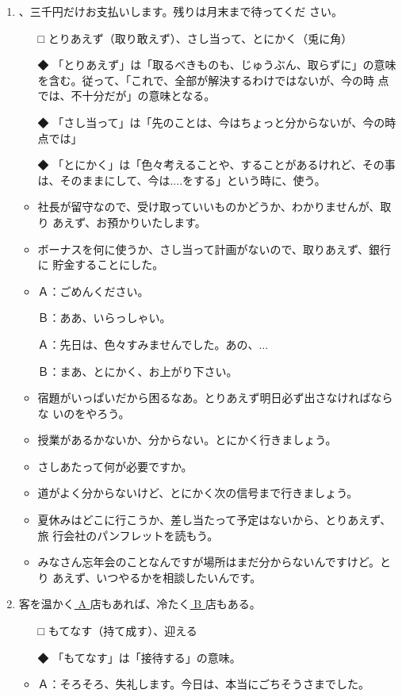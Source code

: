 \documentclass[
uplatex,
b5paper,
10pt,
dvipdfmx
]{jsbook}
\begin{document}
\begin{enumerate}
\item \underline{     }、三千円だけお支払いします。残りは月末まで待ってくだ
      さい。
\begin{itemize}
\item[□] とりあえず（取り敢えず）、さし当って、とにかく（兎に角）
\item[◆] 「とりあえず」は「取るべきものも、じゅうぶん、取らずに」の意味
	  を含む。従って、「これで、全部が解決するわけではないが、今の時
	  点では、不十分だが」の意味となる。
\item[◆] 「さし当って」は「先のことは、今はちょ{}っと分からないが、今の時
	  点では」
\item[◆] 「とにかく」は「色々考えることや、することがあるけれど、その事
	  は、そのままにして、今は....をする」という時に、使う。
\end{itemize}
\begin{itemize}
\item 社長が留守なので、受け取っていいものかどうか、わかりませんが、取り
      あえず、お預かりいたします。
\item ボーナスを何に使うか、さし当って計画がないので、取りあえず、銀行に
      貯金することにした。
\item Ａ：ごめんください。

      Ｂ：ああ、いらっしゃい。

      Ａ：先日は、色々すみませんでした。あの、...

      Ｂ：まあ、とにかく、お上がり下さい。

\item 宿題がいっぱいだから困るなあ。とりあえず明日必ず出さなければならな
      いのをやろう。
\item 授業があるかないか、分からない。とにかく行きましょう。
\item さしあたって何が必要ですか。
\item 道がよく分からないけど、とにかく次の信号まで行きましょう。
\item 夏休みはどこに行こうか、差し当たって予定はないから、とりあえず、旅
      行会社のパンフレットを読もう。
\item みなさん忘年会のことなんですが場所はまだ分からないんですけど。とり
      あえず、いつやるかを相談したいんです。
\end{itemize}

\item 客を温かく\underline{  A  }店もあれば、冷たく\underline{  B  }店もある。
\begin{itemize}
\item[□] もてなす（持て成す）、迎える
\item[◆] 「もてなす」は「接待する」の意味。
\end{itemize}
\begin{itemize}
\item Ａ：そろそろ、失礼します。今日は、本当にごちそうさまでした。


\end{itemize}
\end{enumerate}
\end{document}
